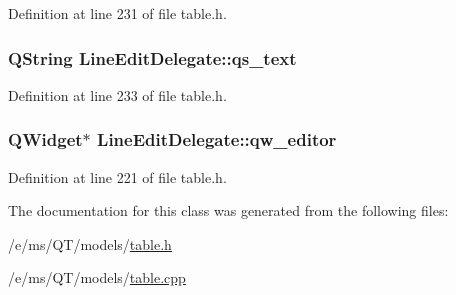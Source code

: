 Definition at line 231 of file table.h.

\hypertarget{classLineEditDelegate_ad734b27bd24f9eebab7dc0b0a70897a7}{
\subsubsection[{qs\_\-text}]{\setlength{\rightskip}{0pt plus 5cm}QString {\bf LineEditDelegate::qs\_\-text}}}
\label{classLineEditDelegate_ad734b27bd24f9eebab7dc0b0a70897a7}


Definition at line 233 of file table.h.

\hypertarget{classLineEditDelegate_a16d00d8e62e3c89978d07adcffa007c9}{
\subsubsection[{qw\_\-editor}]{\setlength{\rightskip}{0pt plus 5cm}QWidget$\ast$ {\bf LineEditDelegate::qw\_\-editor}}}
\label{classLineEditDelegate_a16d00d8e62e3c89978d07adcffa007c9}


Definition at line 221 of file table.h.



The documentation for this class was generated from the following files:\begin{DoxyCompactItemize}
\item 
/e/ms/QT/models/\hyperlink{table_8h}{table.h}\item 
/e/ms/QT/models/\hyperlink{table_8cpp}{table.cpp}\end{DoxyCompactItemize}
